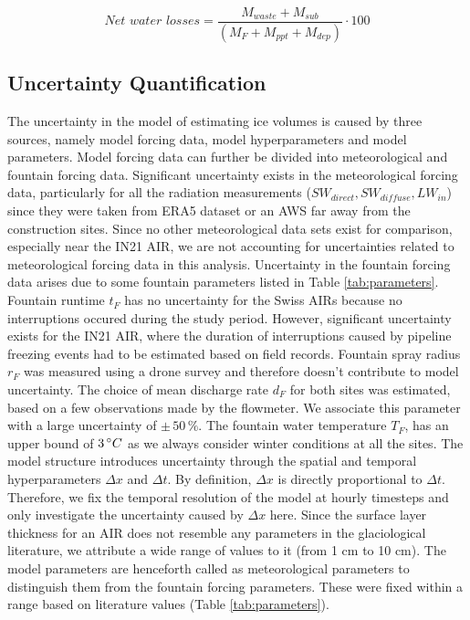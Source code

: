 \begin{equation} \textit{Net water losses} = \frac{M_{waste}+M_{sub}}{(M_F+M_{ppt}+M_{dep})} \cdot 100 \end{equation}


\subsection{Uncertainty Quantification}

The uncertainty in the model of estimating ice volumes is caused by three sources, namely model forcing
data, model hyperparameters and model parameters. Model forcing data can further be divided into meteorological and
fountain forcing data. Significant uncertainty exists in the meteorological forcing data, particularly for all the
radiation measurements ($SW_{direct}, SW_{diffuse}, LW_{in}$) since they were taken from ERA5 dataset or an
\ac{AWS} far away from the construction sites. Since no other meteorological data sets exist for comparison,
especially near the IN21 AIR, we are not accounting for uncertainties related to meteorological forcing data in
this analysis. Uncertainty in the fountain forcing data arises due to some fountain parameters listed in
Table \ref{tab:parameters}. Fountain runtime $t_F$ has no uncertainty for the Swiss \ac{AIRs} because no
interruptions occured during the study period. However, significant uncertainty exists for the IN21 AIR, where
the duration of interruptions caused by pipeline freezing events had to be estimated based on field records.
Fountain spray radius $r_F$ was measured using a drone survey and therefore doesn't contribute to model
uncertainty. The choice of mean discharge rate $d_F$ for both sites was estimated, based on a few
observations made by the flowmeter. We associate this parameter with a large uncertainty of $\pm \,50\, \%$.
The fountain water temperature $T_F$, has an upper bound of $3\, ^{\circ} C$ as we always consider winter
conditions at all the sites. The model structure introduces uncertainty through the spatial and temporal
hyperparameters $\Delta x$ and $\Delta t$. By definition, $\Delta x$ is directly proportional to $\Delta t$.
Therefore, we fix the temporal resolution of the model at hourly timesteps and only investigate the uncertainty
caused by $\Delta x$ here. Since the surface layer thickness for an AIR does not resemble any parameters in the
glaciological literature, we attribute a wide range of values to it (from 1 cm to 10 cm). The model parameters
are henceforth called as meteorological parameters to distinguish them from the fountain forcing parameters.
These were fixed within a range based on literature values (Table \ref{tab:parameters}).

